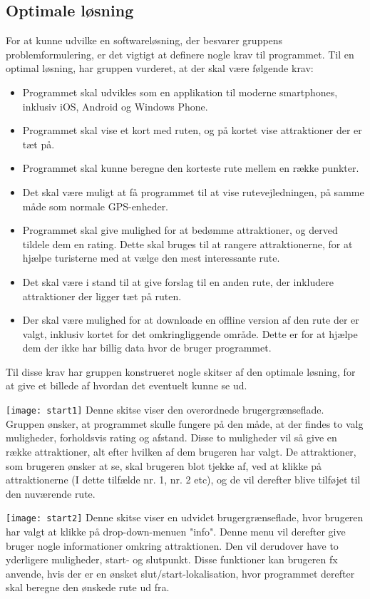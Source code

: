\subsection{Optimale løsning}
For at kunne udvilke en softwareløsning, der besvarer gruppens problemformulering, er det vigtigt at definere nogle krav til programmet. Til en optimal løsning, har gruppen vurderet, at der skal være følgende krav:
\begin{itemize}
	\item Programmet skal udvikles som en applikation til moderne smartphones, inklusiv iOS, Android og Windows Phone. 
	\item Programmet skal vise et kort med ruten, og på kortet vise attraktioner der er tæt på. 
	\item Programmet skal kunne beregne den korteste rute mellem en række punkter.
	\item Det skal være muligt at få programmet til at vise rutevejledningen, på samme måde som normale GPS-enheder. 
	\item Programmet skal give mulighed for at bedømme attraktioner, og derved tildele dem en rating. Dette skal bruges til at rangere attraktionerne, for at hjælpe turisterne med at vælge den mest interessante rute. 
	\item Det skal være i stand til at give forslag til en anden rute, der inkludere attraktioner der ligger tæt på ruten.
	\item Der skal være mulighed for at downloade en offline version af den rute der er valgt, inklusiv kortet for det omkringliggende område. Dette er for at hjælpe dem der ikke har billig data hvor de bruger programmet.
\end{itemize}
Til disse krav har gruppen konstrueret nogle skitser af den optimale løsning, for at give et billede af hvordan det eventuelt kunne se ud. \newline


\texttt{[image: start1]} \newline
Denne skitse viser den overordnede brugergrænseflade. Gruppen ønsker, at programmet skulle fungere på den måde, at der findes to valg muligheder, forholdsvis rating og afstand. Disse to muligheder vil så give en række attraktioner, alt efter hvilken af dem brugeren har valgt. De attraktioner, som brugeren ønsker at se, skal brugeren blot tjekke af, ved at klikke på attraktionerne (I dette tilfælde nr. 1, nr. 2 etc), og de vil derefter blive tilføjet til den nuværende rute. 


\texttt{[image: start2]} \newline
Denne skitse viser en udvidet brugergrænseflade, hvor brugeren har valgt at klikke på drop-down-menuen "info". Denne menu vil derefter give bruger nogle informationer omkring attraktionen. Den vil derudover have to yderligere muligheder, start- og slutpunkt. Disse funktioner kan brugeren fx anvende, hvis der er en ønsket slut/start-lokalisation, hvor programmet derefter skal beregne den ønskede rute ud fra. \newline


